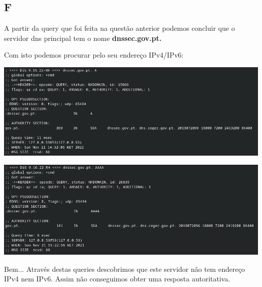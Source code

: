 \documentclass{report}
\begin{document}
        \subsection*{F}
            A partir da query que foi feita na questão anterior podemos concluir que o servidor dns principal tem o nome \textbf{dnssec.gov.pt.}\par
            Com isto podemos procurar pelo seu endereço IPv4/IPv6:
            \par 
            \noindent
            \includegraphics[width=\textwidth]{images/dig_dnssec_a.png}
            \par 
            \noindent
            \includegraphics[width=\textwidth]{images/dig_dnssec_aaaa.png}
            \par
            Bem... Através destas queries descobrimos que este servidor não tem endereço IPv4 nem IPv6.
            Assim não conseguimos obter uma resposta autoritativa.
\end{document}
